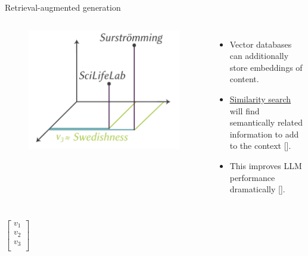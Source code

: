 \documentclass[10pt]{beamer}
\newcommand{\citeme}[1]{{\xspace\color{scAqua} \scriptsize [\cite{#1}]}}
\begin{document}

\begin{frame}{Retrieval-augmented generation}
	\begin{columns}[T,onlytextwidth]
		\hspace*{-0.7cm} 
		\begin{figure}
			\includegraphics[width=\textwidth]{figures/3D_word_to_vec_similarity.png}
		\end{figure}
		\vspace{0.7cm}
		\begin{itemize}
			\item Vector databases can additionally store embeddings of content.  
			\item \href{https://github.com/facebookresearch/faiss}{Similarity search} will find semantically related information to add to the context\citeme{Douze2024}.
			\item This improves LLM performance dramatically\citeme{Alammar2022}.
		\end{itemize}
	\end{columns}
	\begin{columns}[T,onlytextwidth]
		\hspace*{-0.7cm} 
		\vspace{-0.3cm}
		$$
		\begin{bmatrix}
			v_1 \\
			v_2 \\
			v_3 \\

\end{bmatrix}$$
\end{columns}
\end{frame}
\end{document}
